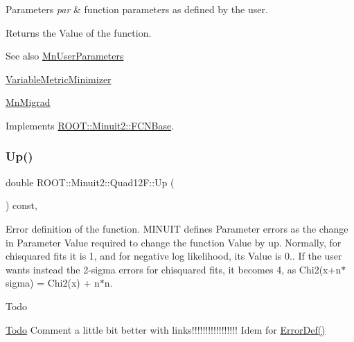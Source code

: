 \begin{DoxyParams}{Parameters}
{\em par} & function parameters as defined by the user.\\
\hline
\end{DoxyParams}
\begin{DoxyReturn}{Returns}
the Value of the function.
\end{DoxyReturn}
\begin{DoxySeeAlso}{See also}
\mbox{\hyperlink{classROOT_1_1Minuit2_1_1MnUserParameters}{Mn\+User\+Parameters}} 

\mbox{\hyperlink{classROOT_1_1Minuit2_1_1VariableMetricMinimizer}{Variable\+Metric\+Minimizer}} 

\mbox{\hyperlink{classROOT_1_1Minuit2_1_1MnMigrad}{Mn\+Migrad}} 
\end{DoxySeeAlso}


Implements \mbox{\hyperlink{classROOT_1_1Minuit2_1_1FCNBase_ae4a86bd94d0d0f5ca6fc8f8ab2bb43cd}{R\+O\+O\+T\+::\+Minuit2\+::\+F\+C\+N\+Base}}.

\mbox{\label{classROOT_1_1Minuit2_1_1Quad12F_afbb216349fbceafc530845fe1cff5af4}} 
\subsubsection{\texorpdfstring{Up()}{Up()}\hspace{0.1cm}{\footnotesize\ttfamily [1/2]}}
{\footnotesize\ttfamily double R\+O\+O\+T\+::\+Minuit2\+::\+Quad12\+F\+::\+Up (\begin{DoxyParamCaption}{ }\end{DoxyParamCaption}) const\hspace{0.3cm}{\ttfamily [inline]}, {\ttfamily [virtual]}}

Error definition of the function. M\+I\+N\+U\+IT defines Parameter errors as the change in Parameter Value required to change the function Value by up. Normally, for chisquared fits it is 1, and for negative log likelihood, its Value is 0.. If the user wants instead the 2-\/sigma errors for chisquared fits, it becomes 4, as Chi2(x+n$\ast$sigma) = Chi2(x) + n$\ast$n.

\begin{DoxyRefDesc}{Todo}
\item[\mbox{\hyperlink{todo__todo000001}{Todo}}]Comment a little bit better with links!!!!!!!!!!!!!!!!! Idem for \mbox{\hyperlink{classROOT_1_1Minuit2_1_1FCNBase_ac4592475c58a65b037ba97ab5f3cba10}{Error\+Def()}}\end{DoxyRefDesc}


